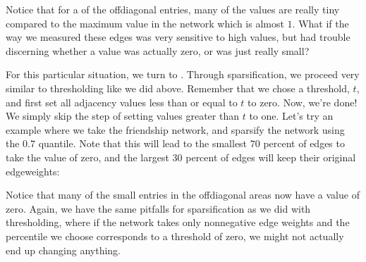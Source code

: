 \documentclass[letterpaper,10pt,english]{jupyterBook}
\begin{document}
\sphinxAtStartPar
Notice that for a  of the off\sphinxhyphen{}diagonal entries, many of the values are really tiny compared to the maximum value in the network which is almost \(1\). What if the way we measured these edges was very sensitive to high values, but had trouble discerning whether a value was actually zero, or was just really small?

\sphinxAtStartPar
For this particular situation, we turn to . Through sparsification, we proceed very similar to thresholding like we did above. Remember that we chose a threshold, \(t\), and first set all adjacency values less than or equal to \(t\) to zero. Now, we’re done! We simply skip the step of setting values greater than \(t\) to one. Let’s try an example where we take the friendship network, and sparsify the network using the \(0.7\) quantile. Note that this will lead to the smallest \(70\) percent of edges to take the value of zero, and the largest \(30\) percent of edges will keep their original edge\sphinxhyphen{}weights:

\begin{sphinxVerbatim}[commandchars=\\\{\}]
  

  \PYG{p}{[}\PYG{p}{]}   
    

\PYG{p}{[}  \PYG{p}{]}  
\end{sphinxVerbatim}

\sphinxAtStartPar
Notice that many of the small entries in the off\sphinxhyphen{}diagonal areas now have a value of zero. Again, we have the same pitfalls for sparsification as we did with thresholding, where if the network takes only non\sphinxhyphen{}negative edge weights and the percentile we choose corresponds to a threshold of zero, we might not actually end up changing anything.
\end{document}
